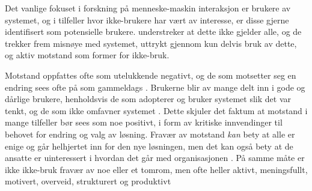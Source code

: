 \noindent
Det vanlige fokuset i forskning på menneske-maskin interaksjon er brukere av systemet, og i tilfeller hvor ikke-brukere har vært av interesse, er disse gjerne identifisert som potensielle brukere. \citet{Satchell09} understreker at dette ikke gjelder alle, og de trekker frem misnøye med systemet, uttrykt gjennom kun delvis bruk av dette, og aktiv motstand som former for ikke-bruk.
 
\noindent
Motstand oppfattes ofte som utelukkende negativt, og de som motsetter seg en endring sees ofte på som gammeldags \citep{Jacobsen12}. Brukerne blir av mange delt inn i gode og  dårlige brukere, henholdsvis de som adopterer og bruker systemet slik det var tenkt, og de som ikke omfavner systemet \citep{Satchell09}. Dette skjuler det faktum at motstand i mange tilfeller bør sees som noe positivt, i form av kritiske innvendinger til behovet for endring og valg av løsning. Fravær av motstand \textit{kan} bety at alle er enige og går helhjertet inn for den nye løsningen, men det kan også bety at de ansatte er uinteressert i hvordan det går med organisasjonen \citep{Jacobsen12}. På samme måte er ikke ikke-bruk fravær av noe eller et tomrom, men ofte heller aktivt, meningsfullt, motivert, overveid, strukturert og produktivt \citep{Satchell09}
 

